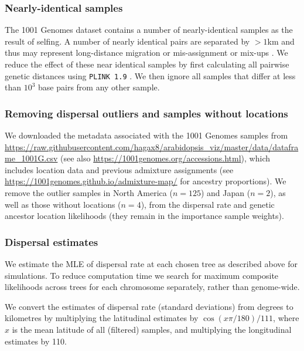 \documentclass[12pt]{article}
\begin{document}
\subsubsection*{Nearly-identical samples}

The 1001 Genomes dataset contains a number of nearly-identical samples as the result of selfing.
A number of nearly identical pairs are separated by $>1$km and thus may represent long-distance migration or mis-assignment or mix-ups \citep{alonso2016}.
We reduce the effect of these near identical samples by first calculating all pairwise genetic distances using \texttt{PLINK 1.9} \citep[with the \texttt{--distance allele-ct} option; see Figure 3A in][]{alonso2016}.
We then ignore all samples that differ at less than $10^3$ base pairs from any other sample.

\subsubsection*{Removing dispersal outliers and samples without locations}

We downloaded the metadata associated with the 1001 Genomes samples from \url{https://raw.githubusercontent.com/hagax8/arabidopsis_viz/master/data/dataframe_1001G.csv} (see also \url{https://1001genomes.org/accessions.html}), which includes location data and previous admixture assignments \citep{alonso2016} (see \url{https://1001genomes.github.io/admixture-map/} for ancestry proportions).
We remove the outlier samples in North America ($n=125$) and Japan ($n=2$), as well as those without locations ($n=4$), from the dispersal rate and genetic ancestor location likelihoods (they remain in the importance sample weights).

\subsubsection*{Dispersal estimates}

We estimate the MLE of dispersal rate at each chosen tree as described above for simulations. 
To reduce computation time we search for maximum composite likelihoods across trees for each chromosome separately, rather than genome-wide.

We convert the estimates of dispersal rate (standard deviations) from degrees to kilometres by multiplying the latitudinal estimates by $\cos(x \pi/180)/111$, where $x$ is the mean latitude of all (filtered) samples, and multiplying the longitudinal estimates by 110.
\end{document}

